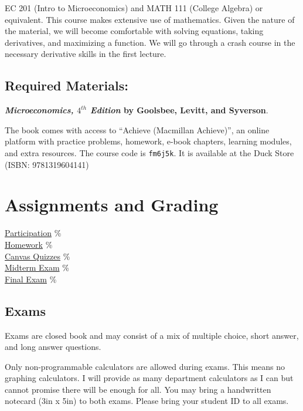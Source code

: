 EC 201 (Intro to Microeconomics) and MATH 111 (College Algebra) or equivalent.
This course makes extensive use of mathematics.
Given the nature of the material, we will become comfortable with solving equations, taking derivatives, and maximizing a function.
We will go through a crash course in the necessary derivative skills in the first lecture.

\subsection*{Required Materials:}

\textbf{\textit{Microeconomics, $4^{th}$ Edition} by Goolsbee, Levitt, and Syverson}.

The book comes with access to “Achieve (Macmillan Achieve)”, an online platform with practice problems, homework, e-book chapters, learning modules, and extra resources.
The course code is \texttt{fm6j5k}.
It is available at the Duck Store (ISBN: 9781319604141)

\section{Assignments and Grading} 

\begin{center}\begin{minipage}{3.8in}\begin{flushleft}
    \hyperlink{grading_participation}{Participation} \% \\
    \hyperlink{grading_HW}{Homework}         \% \\
    \hyperlink{grading_quiz}{Canvas Quizzes} \% \\
    \hyperlink{grading_exam}{Midterm Exam}   \% \\
    \hyperlink{grading_exam}{Final Exam}     \% \\
\end{flushleft}\end{minipage}\end{center}

\hypertarget{grading_exam}{\subsection{Exams}}

Exams are closed book and may consist of a mix of multiple choice, short answer, and long answer questions.

Only non-programmable calculators are allowed during exams.
This means no graphing calculators.
I will provide as many department calculators as I can but cannot promise there will be enough for all.
You may bring a handwritten notecard (3in x 5in) to both exams.
Please bring your student ID to all exams.

